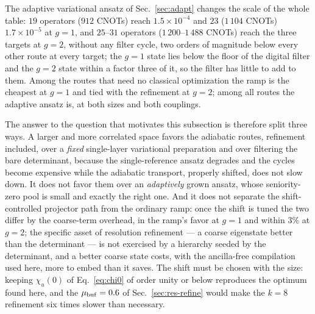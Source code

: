\documentclass[
  aps,            %
  prc,            %
  reprint,        %
  superscriptaddress,
  floatfix,
  nofootinbib
]{revtex4-2}
\begin{document}
The adaptive variational ansatz of Sec.~\ref{sec:adapt} changes the scale
of the whole table: $19$ operators ($912$ CNOTs) reach $1.5\times10^{-4}$
and $23$ ($1\,104$ CNOTs) $1.7\times10^{-5}$ at $g=1$, and $25$--$31$
operators ($1\,200$--$1\,488$ CNOTs) reach the three targets at $g=2$,
without any filter cycle, two orders of magnitude below every other route
at every target; the $g=1$ state lies below the floor of the digital filter
and the $g=2$ state within a factor three of it, so the filter has little
to add to them.  Among the routes that need no classical optimization the
ramp is the cheapest at $g=1$ and tied with the refinement at $g=2$; among
all routes the adaptive ansatz is, at both sizes and both couplings.

The answer to the question that motivates this subsection is therefore
split three ways.  A larger and more correlated space favors the adiabatic
routes, refinement included, over a \emph{fixed} single-layer variational
preparation and over filtering the bare determinant, because the
single-reference ansatz degrades and the cycles become expensive while the
adiabatic transport, properly shifted, does not slow down.  It does not
favor them over an \emph{adaptively} grown ansatz, whose seniority-zero
pool is small and exactly the right one.  And it does not separate the
shift-controlled projector path from the ordinary ramp: once the shift is
tuned the two differ by the coarse-term overhead, in the ramp's favor at
$g=1$ and within $3\%$ at $g=2$; the specific asset of resolution
refinement --- a coarse eigenstate better than the determinant --- is not
exercised by a hierarchy seeded by the determinant, and a better coarse
state costs, with the ancilla-free compilation used here, more to embed
than it saves.  The shift must be chosen with the size: keeping
$\chi_u(0)$ of Eq.~\eqref{eq:chi0} of order unity or below reproduces the
optimum found here, and the $\mu_{\rm buf}=0.6$ of Sec.~\ref{sec:res-refine}
would make the $k=8$ refinement six times slower than necessary.

\end{document}

